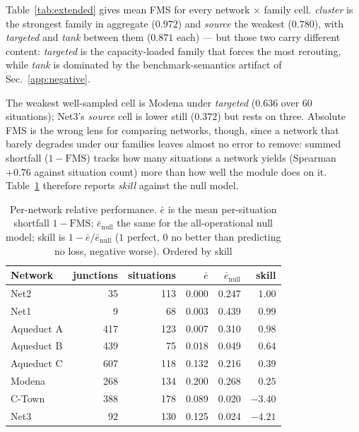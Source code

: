 \documentclass[11pt]{article}
\begin{document}
Table~\ref{tab:extended} gives mean FMS for every network $\times$ family cell.
\emph{cluster} is the strongest family in aggregate ($0.972$) and \emph{source}
the weakest ($0.780$), with \emph{targeted} and \emph{tank} between them ($0.871$
each) --- but those two carry different content: \emph{targeted} is the
capacity-loaded family that forces the most rerouting, while \emph{tank} is
dominated by the benchmark-semantics artifact of Sec.~\ref{app:negative}.

The weakest well-sampled cell is Modena under \emph{targeted} ($0.636$ over $60$
situations); Net3's \emph{source} cell is lower still ($0.372$) but rests on three.
Absolute FMS is the wrong lens for comparing networks, though, since a network that barely degrades
under our families leaves almost no error to remove: summed shortfall
($1-\mathrm{FMS}$) tracks how many situations a network yields (Spearman $+0.76$
against situation count) more than how well the module does on it. Table~\ref{tab:skill}
therefore reports \emph{skill} against the null model.

\begin{table}[h]
\centering
\caption{Per-network relative performance. $\bar{e}$ is the mean per-situation
shortfall $1-\mathrm{FMS}$; $\bar{e}_{\mathrm{null}}$ the same for the all-operational
null model; skill is $1-\bar{e}/\bar{e}_{\mathrm{null}}$ ($1$ perfect, $0$ no better
than predicting no loss, negative worse). Ordered by skill}\label{tab:skill}
\small
\begin{tabular}{@{}lrrrrr@{}}
\toprule
Network & junctions & situations & $\bar{e}$ & $\bar{e}_{\mathrm{null}}$ & skill\\
\midrule
Net2       &  35 & 113 & 0.000 & 0.247 & $1.00$\\
Net1       &   9 &  68 & 0.003 & 0.439 & $0.99$\\
Aqueduct A & 417 & 123 & 0.007 & 0.310 & $0.98$\\
Aqueduct B & 439 &  75 & 0.018 & 0.049 & $0.64$\\
Aqueduct C & 607 & 118 & 0.132 & 0.216 & $0.39$\\
Modena     & 268 & 134 & 0.200 & 0.268 & $0.25$\\
C-Town     & 388 & 178 & 0.089 & 0.020 & $-3.40$\\
Net3       &  92 & 130 & 0.125 & 0.024 & $-4.21$\\
\bottomrule
\end{tabular}
\end{table}
\end{document}
